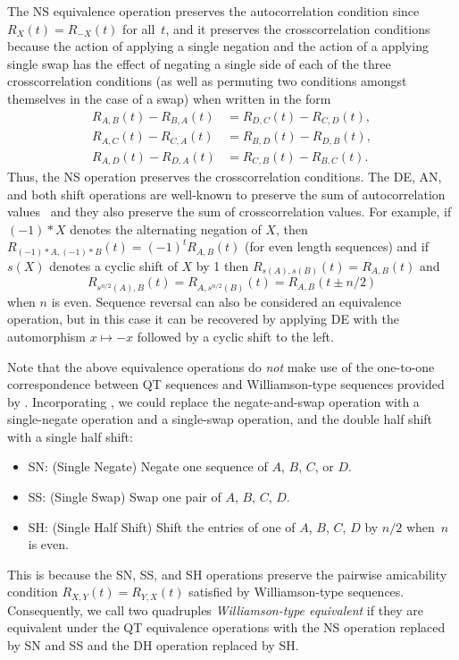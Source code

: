 \documentclass[12pt]{article}
\numberwithin{equation}{section}
\newcommand{\eq}{=}
\begin{document}
The NS equivalence operation preserves the autocorrelation condition
since $R_X(t)=R_{-X}(t)$ for all~$t$, and it preserves the crosscorrelation conditions because
the action of applying a single negation and the action of a applying single swap
has the effect of negating a single side of each of
the three crosscorrelation conditions (as well as permuting two conditions
amongst themselves in the case of a swap) when written in the form
\begin{align*}
    R_{A,B}(t)-R_{B,A}(t)&\eq R_{D,C}(t)-R_{C,D}(t), \\
    R_{A,C}(t)-R_{C,A}(t)&\eq R_{B,D}(t)-R_{D,B}(t), \\
    R_{A,D}(t)-R_{D,A}(t)&\eq R_{C,B}(t)-R_{B,C}(t).
\end{align*}
Thus, the NS operation preserves the crosscorrelation conditions.
The DE, AN, and both shift operations are well-known to preserve
the sum of autocorrelation values~\cite{Lumsden2025}
and they also preserve the sum of crosscorrelation values.
For example, if $(-1)*X$ denotes the alternating negation of $X$,
then $R_{(-1)*A,(-1)*B}(t)=(-1)^t R_{A,B}(t)$ (for even length sequences)
and if $s(X)$ denotes a cyclic shift
of $X$ by 1 then $R_{s(A),s(B)}(t)=R_{A,B}(t)$ and
\[ R_{s^{n/2}(A),B}(t) = R_{A,s^{n/2}(B)}(t) = R_{A,B}(t\pm n/2) \]
when $n$ is even.
Sequence reversal can also be considered an equivalence operation, but in this case it
can be recovered by applying DE with the
automorphism $x\mapsto -x$ followed by a cyclic shift to the left.

Note that the above equivalence operations do \emph{not} make use of
the one-to-one correspondence between QT sequences and Williamson-type sequences
provided by .  Incorporating ,
we could replace the negate-and-swap operation
with a single-negate operation and a single-swap operation,
and the double half shift with a single half shift:
\begin{itemize}
    \item SN: (Single Negate) Negate one sequence of $A$, $B$, $C$, or $D$.
    \item SS: (Single Swap) Swap one pair of $A$, $B$, $C$, $D$.
    \item SH: (Single Half Shift) Shift the entries of one of $A$, $B$, $C$, $D$ by $n/2$ when~$n$ is even.
\end{itemize}
This is because the SN, SS, and SH operations preserve the pairwise amicability
condition $R_{X,Y}(t)=R_{Y,X}(t)$ satisfied by Williamson-type sequences.
Consequently, we call two quadruples \emph{Williamson-type equivalent}
if they are equivalent under the
QT equivalence operations with the NS operation replaced by SN and SS
and the DH operation replaced by SH\@.
\end{document}
